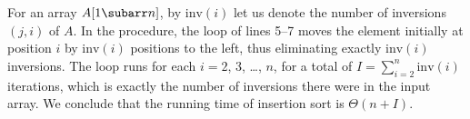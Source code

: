 For an array $A[1\subarr n]$, by $\mathrm{inv}(i)$ let us denote the number of inversions $(j,i)$ of $A$.
In the  procedure, the  loop of lines 5--7 moves the element initially at position $i$ by $\mathrm{inv}(i)$ positions to the left, thus eliminating exactly $\mathrm{inv}(i)$ inversions.
The  loop runs for each $i=2$, 3, \dots, $n$, for a total of $I=\sum_{i=2}^n\mathrm{inv}(i)$ iterations, which is exactly the number of inversions there were in the input array.
We conclude that the running time of insertion sort is $\Theta(n+I)$.
